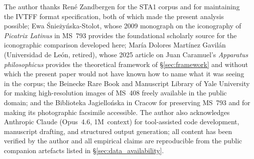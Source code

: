 The author thanks Ren\'e Zandbergen for the STA1 corpus and for
maintaining the IVTFF format specification, both of which made the
present analysis possible; Ewa \'Snie\.zy\'nska-Stolot, whose 2009
monograph on the iconography of \textit{Picatrix Latinus} in MS~793
provides the foundational scholarly source for the iconographic
comparison developed here; Mar\'ia Dolores Mart\'inez Gavil\'an
(Universidad de Le\'on, retired), whose 2025 article on Juan
Caramuel's \textit{Apparatus philosophicus} provides the theoretical
framework of \S\ref{sec:framework} and without which the present
paper would not have known how to name what it was seeing in the
corpus; the Beinecke Rare Book and Manuscript Library of Yale
University for making high-resolution images of MS~408 freely
available in the public domain; and the Biblioteka Jagiello\'nska in
Cracow for preserving MS~793 and for making its photographic
facsimile accessible. The author also acknowledges Anthropic Claude
(Opus~4.6, 1M~context) for tool-assisted code development, manuscript
drafting, and structured output generation; all content has been
verified by the author and all empirical claims are reproducible from
the public companion artefacts listed in
\S\ref{sec:data_availability}.

